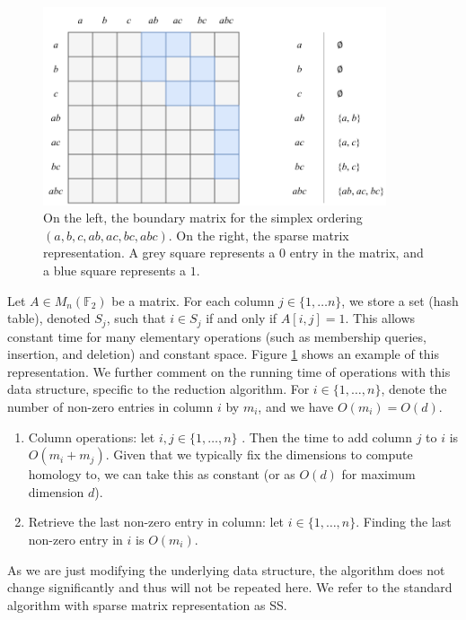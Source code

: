 \begin{figure}
  \centering
  \includegraphics[width=0.9\textwidth]{content/4-comp-top/images/sparse-representation-ex}  
  \caption{On the left, the boundary matrix for the simplex ordering $(a, b, c, ab, ac, bc, abc)$. On the right, the sparse matrix representation. A grey square represents a $0$ entry in the matrix, and a blue square represents a $1$.}
  \label{fig:sparse-representation-ex}
\end{figure}

Let $A \in M_n(\mathbb F_2)$ be a matrix. For each column $j \in \{1, \ldots n\}$, we store a set (hash table), denoted $S_j$, such that $i \in S_j$ if and only if $A[i,j] = 1$. This allows constant time for many elementary operations (such as membership queries, insertion, and deletion) and constant space. Figure \ref{fig:sparse-representation-ex} shows an example of this representation. We further comment on the running time of operations with this data structure, specific to the reduction algorithm. For $i \in \{1, \ldots, n\}$, denote the number of non-zero entries in column $i$ by $m_i$, and we have $O(m_i) = O(d)$.

\begin{enumerate}
  \item Column operations: let $i, j \in \{1, \ldots, n\}$ . Then the time to add column $j$ to $i$ is $O(m_i + m_j)$. Given that we typically fix the dimensions to compute homology to, we can take this as constant (or as $O(d)$ for maximum dimension $d$).
  \item Retrieve the last non-zero entry in column: let $i \in \{1, \ldots, n\}$. Finding the last non-zero entry in $i$ is $O(m_i)$.
\end{enumerate}

As we are just modifying the underlying data structure, the algorithm does not change significantly and thus will not be repeated here. We refer to the standard algorithm with sparse matrix representation as \textsc{SS}. 

